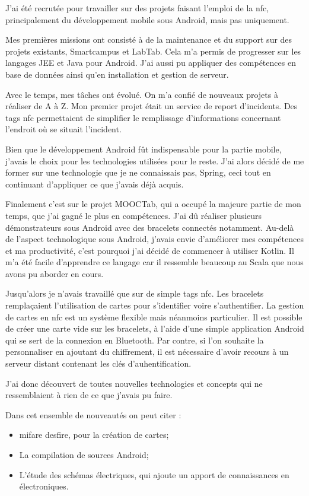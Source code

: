 \documentclass[french,12pt,a4paper,titlepage,openright,openbib]{report}
\begin{document}
J'ai été recrutée pour travailler sur des projets faisant l'emploi de la \gls{nfc}, principalement du développement mobile sous Android, mais pas uniquement.

Mes premières missions ont consisté à de la maintenance et du support sur des projets existants, Smartcampus et LabTab. Cela m'a permis de progresser sur les langages JEE et Java pour Android. J'ai aussi pu appliquer des compétences en base de données ainsi qu'en installation et gestion de serveur.

Avec le temps, mes tâches ont évolué. On m'a confié de nouveaux projets à réaliser de A à Z.
Mon premier projet était un service de report d'incidents. Des tags \gls{nfc} permettaient de simplifier le remplissage d'informations concernant l'endroit où se situait l'incident.

Bien que le développement Android fût indispensable pour la partie mobile, j'avais le choix pour les technologies utilisées pour le reste. J'ai alors décidé de me former sur une technologie que je ne connaissais pas, Spring, ceci tout en continuant d'appliquer ce que j'avais déjà acquis.

Finalement c'est sur le projet MOOCTab, qui a occupé la majeure partie de mon temps, que j'ai gagné le plus en compétences. J'ai dû réaliser plusieurs démonstrateurs sous Android avec des bracelets connectés notamment.
Au-delà de l'aspect technologique sous Android, j'avais envie d'améliorer mes compétences et ma productivité, c'est pourquoi j'ai décidé de commencer à utiliser Kotlin. Il m'a été facile d'apprendre ce langage car il ressemble beaucoup au Scala que nous avons pu aborder en cours. 

Jusqu'alors je n'avais travaillé que sur de simple tags \gls{nfc}. Les bracelets remplaçaient l'utilisation de cartes pour s'identifier voire s'authentifier.
La gestion de cartes en \gls{nfc} est un système flexible mais néanmoins particulier. Il est possible de créer une carte vide sur les bracelets, à l'aide d'une simple application Android qui se sert de la connexion en Bluetooth. Par contre, si l'on souhaite la personnaliser en ajoutant du chiffrement, il est nécessaire d'avoir recours à un serveur distant contenant les clés d'auhentification.

J'ai donc découvert de toutes nouvelles technologies et concepts qui ne ressemblaient à rien de ce que j'avais pu faire.
\par
Dans cet ensemble de nouveautés on peut citer :
\begin{itemize}
\item \gls{mifare} \gls{desfire}, pour la création de cartes;
\item La compilation de sources Android;
\item L'étude des schémas électriques, qui ajoute un apport de connaissances en électroniques.
\end{itemize}
\end{document}
